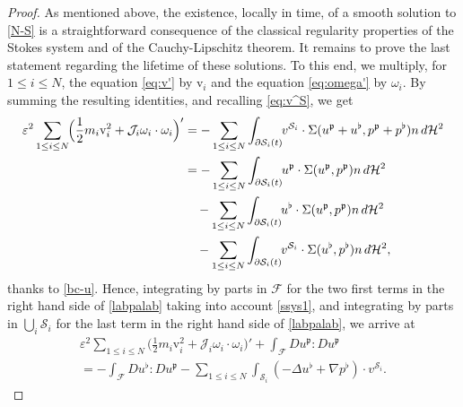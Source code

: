 \documentclass[10pt]{amsart}
\let\eps\varepsilon
\newcommand{\dd}{\,d}
\theoremstyle{definition}
\theoremstyle{remark}
\begin{document}
\begin{proof}
As mentioned above, the existence, locally in time, of a smooth solution to \eqref{N-S} is a straightforward consequence of the classical regularity properties of the Stokes system and of the Cauchy-Lipschitz theorem. It remains to prove
the last statement regarding the lifetime of these solutions.
To this end, we multiply, for $ 1\leq i \leq N$,
the equation \eqref{eq:v'} by
$\textrm{v}_i $ and the equation
\eqref{eq:omega'} by $\omega_i$.
By summing the resulting identities, and recalling \eqref{eq:v^S}, we get
\begin{equation}
\begin{aligned}
\eps^2 \sum_{1\leq i \leq N}\hspace*{-1mm} \Big(\frac12 m_i \textrm{v}_i^2
+ \mathcal{J}_i \omega_i \cdot \omega_i \Big)'
&=- \sum_{1\leq i \leq N} \int_{\partial \mathcal S_i (t)}\hspace*{-1mm} v^{{\mathcal S}_i}
\cdot \Sigma(u^\mathfrak{p} + u^\flat,p^\mathfrak{p} + p^\flat) n \dd\mathcal{H}^2
\\
&=- \sum_{1\leq i \leq N} \int_{\partial \mathcal S_i (t)}\hspace*{-1mm} u^\mathfrak{p}
\cdot \Sigma(u^\mathfrak{p},p^\mathfrak{p}) n \dd\mathcal{H}^2 \\
&\quad - \sum_{1\leq i \leq N} \int_{\partial \mathcal S_i (t)}\hspace*{-1mm} u^\flat
\cdot \Sigma(u^\mathfrak{p},p^\mathfrak{p}) n \dd\mathcal{H}^2
\\ &\quad - \sum_{1\leq i \leq N} \int_{\partial \mathcal S_i (t)}\hspace*{-1mm} v^{{\mathcal S}_i}
\cdot \Sigma(u^\flat,p^\flat) n \dd\mathcal{H}^2,
\label{labpalab}
\end{aligned}
\end{equation}
thanks to \eqref{bc-u}.
Hence, integrating by parts
in ${\mathcal F}$ for the two first terms in the right hand side of \eqref{labpalab}
taking into account \eqref{ssys1}, and integrating by parts in $\bigcup_i {\mathcal S}_i$ for the last term in the right hand side of \eqref{labpalab}, we arrive at
\begin{multline} \label{nrj}
\eps^2 \sum_{1\leq i \leq N} \Big(\frac12 m_i \textrm{v}_i^2
+ \mathcal{J}_i \omega_i \cdot \omega_i \Big)' + \int_{\mathcal F} D u^\mathfrak{p} : D u^\mathfrak{p}\\
=- \int_{\mathcal F} D u^\flat : D u^\mathfrak{p}
- \sum_{1 \leq i \leq N} \int_{\mathcal S_i} (-\Delta u^\flat + \nabla p^\flat) \cdot v^{{\mathcal S}_i}.

\end{multline}
\end{proof}
\end{document}
